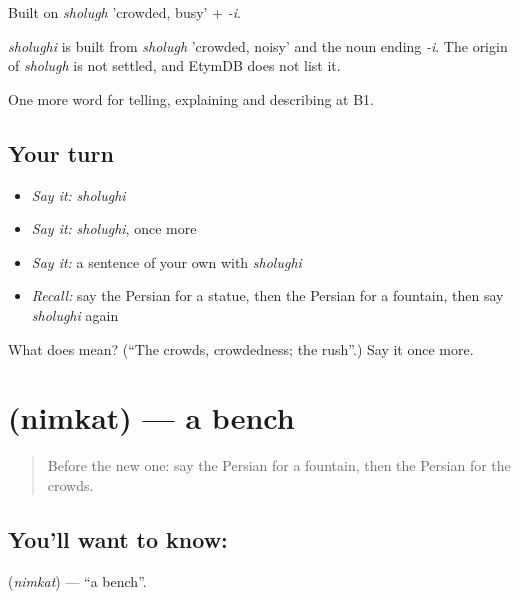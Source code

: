 Built on \emph{sholugh} 'crowded, busy' + \emph{-i}.

\begin{cousinweb}
\emph{sholughi} is built from \emph{sholugh} 'crowded, noisy' and the noun ending \emph{-i}. The origin of \emph{sholugh} is not settled, and EtymDB does not list it.
\end{cousinweb}

\begin{grammarlens}[title={What you've built}]
One more word for telling, explaining and describing at B1.
\end{grammarlens}

\subsection*{Your turn}
\begin{itemize}
\raggedright
  \item \emph{Say it:} \emph{sholughi}
  \item \emph{Say it:} \emph{sholughi}, once more
  \item \emph{Say it:} a sentence of your own with \emph{sholughi}
  \item \emph{Recall:} say the Persian for a statue, then the Persian for a fountain, then say \emph{sholughi} again
\end{itemize}

\begin{tcolorbox}[breakable,colback=teal!4,colframe=teal!35!black,title={Before you move on}]
What does  mean? (\textquotedblleft{}The crowds, crowdedness; the rush\textquotedblright{}.) Say it once more.
\end{tcolorbox}
\section[\texorpdfstring{\fa{نیمکت} (nimkat)}{نیمکت (nimkat)}]{ (nimkat) — a bench}

\label{lesson:FA-C451-nimkat}



\begin{quote}
Before the new one: say the Persian for a fountain, then the Persian for the crowds.
\end{quote}

\subsection*{You'll want to know: }
\textbf{} (\emph{nimkat}) — \textquotedblleft{}a bench\textquotedblright{}.

